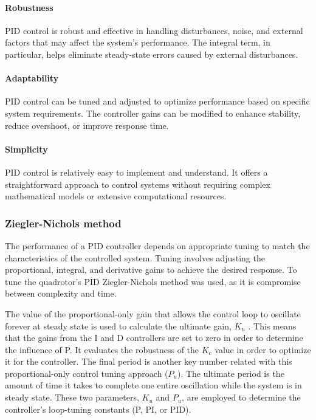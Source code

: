\paragraph{Robustness}PID control is robust and effective in handling disturbances, noise, and external factors that may affect the system's performance. The integral term, in particular, helps eliminate steady-state errors caused by external disturbances. \cite{PIDbook}
\paragraph{Adaptability}PID control can be tuned and adjusted to optimize performance based on specific system requirements. The controller gains can be modified to enhance stability, reduce overshoot, or improve response time. \cite{PIDbook}
\paragraph{Simplicity}PID control is relatively easy to implement and understand. It offers a straightforward approach to control systems without requiring complex mathematical models or extensive computational resources. \cite{PIDbook}

\subsubsection{Ziegler-Nichols method}
The performance of a PID controller depends on appropriate tuning to match the characteristics of the controlled system. Tuning involves adjusting the proportional, integral, and derivative gains to achieve the desired response. 
To tune the quadrotor's PID Ziegler-Nichols method was used, as it is compromise between complexity and time. \cite{ZNPID}

The value of the proportional-only gain that allows the control loop to oscillate forever at steady state is used to calculate the ultimate gain, $K_u$ . This means that the gains from the I and D controllers are set to zero in order to determine the influence of P. It evaluates the robustness of the $K_c$ value in order to optimize it for the controller. The final period is another key number related with this proportional-only control tuning approach ($P_u$). The ultimate period is the amount of time it takes to complete one entire oscillation while the system is in steady state. These two parameters, $K_u$ and $P_u$, are employed to determine the controller's loop-tuning constants (P, PI, or PID). \cite{LibrePID}

